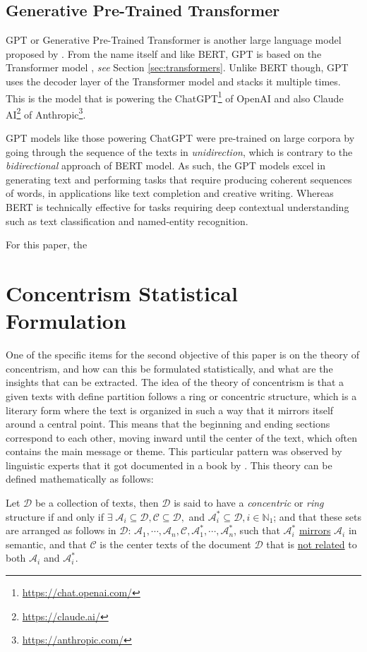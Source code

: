 \subsection{Generative Pre-Trained Transformer}
GPT or Generative Pre-Trained Transformer is another large language model proposed by \cite{radford2018improving}. From the name itself and like BERT, GPT is based on the Transformer model \cite{vaswani2017attention}, \textit{see} Section \ref{sec:transformers}. Unlike BERT though, GPT uses the decoder layer of the Transformer model and stacks it multiple times. This is the model that is powering the ChatGPT\footnote{\url{https://chat.openai.com/}} of OpenAI and also Claude AI\footnote{\url{https://claude.ai/}} of Anthropic\footnote{\url{https://anthropic.com/}}.

GPT models like those powering ChatGPT were pre-trained on large corpora by going through the sequence of the texts in \textit{unidirection}, which is contrary to the \textit{bidirectional} approach of BERT model. As such, the GPT models excel in generating text and performing tasks that require producing coherent sequences of words, in applications like text completion and creative writing. Whereas BERT is technically effective for tasks requiring deep contextual understanding such as text classification and named-entity recognition.

For this paper, the 
\section{Concentrism Statistical Formulation}
One of the specific items for the second objective of this paper is on the theory of concentrism, and how can this be formulated statistically, and what are the insights that can be extracted. The idea of the theory of concentrism is that a given texts with define partition follows a ring or concentric structure, which is a literary form where the text is organized in such a way that it mirrors itself around a central point. This means that the beginning and ending sections correspond to each other, moving inward until the center of the text, which often contains the main message or theme. This particular pattern was observed by linguistic experts that it got documented in a book by . This theory can be defined mathematically as follows:

\begin{defn}[\it Concentric]\label{defn:concentric}
    Let $\mathscr{D}$ be a collection of texts, then $\mathscr{D}$ is said to have a \textit{concentric} or \textit{ring} structure if and only if $\exists\;\mathscr{A}_i\subseteq\mathscr{D},\mathscr{C}\subseteq\mathscr{D},$ and $\mathscr{A}_i^{*}\subseteq\mathscr{D},i\in\mathbb{N}_1$; and that these sets are arranged as follows in $\mathscr{D}$:  $\mathscr{A}_1,\cdots,\mathscr{A}_n,\mathscr{C},\mathscr{A}_1^{*},\cdots,\mathscr{A}_n^{*}$, such that $\mathscr{A}_i^{*}$ \underline{mirrors} $\mathscr{A}_i$ in semantic, and that $\mathscr{C}$ is the center texts of the document $\mathscr{D}$ that is \underline{not related} to both $\mathscr{A}_i$ and $\mathscr{A}_i^{*}$.
\end{defn}

